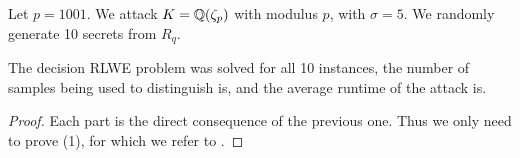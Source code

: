 \documentclass{amsart}
\begin{document}



\begin{Example}
Let $p = 1001$. We attack $K = \mathbb{Q}(\zeta_p)$ with modulus $p$, with $\sigma = 5$. We randomly generate 10 secrets from $R_q$.

The decision RLWE problem was solved for all 10 instances, the number of samples being used to distinguish is, and the average runtime of the attack is.
\end{Example}


\begin{proof}
Each part is the direct consequence of the previous one. Thus we only need to prove (1), for which we refer to \cite{ducas2012ring}.
\end{proof}


\end{document}
